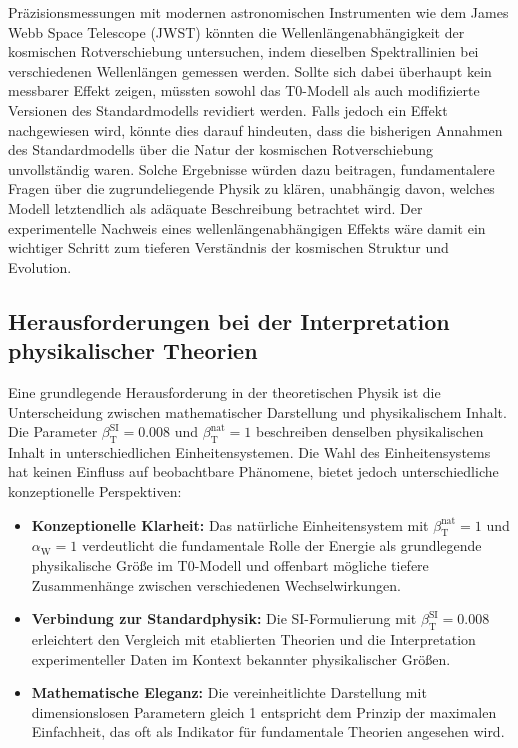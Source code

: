 \documentclass[12pt,a4paper]{article}
\newcommand{\betaT}{\beta_{\text{T}}}
\newcommand{\alphaW}{\alpha_{\text{W}}}
\begin{document}
Präzisionsmessungen mit modernen astronomischen Instrumenten wie dem James Webb Space Telescope (JWST) könnten die Wellenlängenabhängigkeit der kosmischen Rotverschiebung untersuchen, indem dieselben Spektrallinien bei verschiedenen Wellenlängen gemessen werden. Sollte sich dabei überhaupt kein messbarer Effekt zeigen, müssten sowohl das T0-Modell als auch modifizierte Versionen des Standardmodells revidiert werden. Falls jedoch ein Effekt nachgewiesen wird, könnte dies darauf hindeuten, dass die bisherigen Annahmen des Standardmodells über die Natur der kosmischen Rotverschiebung unvollständig waren. Solche Ergebnisse würden dazu beitragen, fundamentalere Fragen über die zugrundeliegende Physik zu klären, unabhängig davon, welches Modell letztendlich als adäquate Beschreibung betrachtet wird. Der experimentelle Nachweis eines wellenlängenabhängigen Effekts wäre damit ein wichtiger Schritt zum tieferen Verständnis der kosmischen Struktur und Evolution.


		
\subsection{Herausforderungen bei der Interpretation physikalischer Theorien}

Eine grundlegende Herausforderung in der theoretischen Physik ist die Unterscheidung zwischen mathematischer Darstellung und physikalischem Inhalt. Die Parameter \(\betaT^{\text{SI}} = 0.008\) und \(\betaT^{\text{nat}} = 1\) beschreiben denselben physikalischen Inhalt in unterschiedlichen Einheitensystemen. Die Wahl des Einheitensystems hat keinen Einfluss auf beobachtbare Phänomene, bietet jedoch unterschiedliche konzeptionelle Perspektiven:

\begin{itemize}
	\item \textbf{Konzeptionelle Klarheit:} Das natürliche Einheitensystem mit \(\betaT^{\text{nat}} = 1\) und \(\alphaW = 1\) verdeutlicht die fundamentale Rolle der Energie als grundlegende physikalische Größe im T0-Modell und offenbart mögliche tiefere Zusammenhänge zwischen verschiedenen Wechselwirkungen.
	
	\item \textbf{Verbindung zur Standardphysik:} Die SI-Formulierung mit \(\betaT^{\text{SI}} = 0.008\) erleichtert den Vergleich mit etablierten Theorien und die Interpretation experimenteller Daten im Kontext bekannter physikalischer Größen.
	
	\item \textbf{Mathematische Eleganz:} Die vereinheitlichte Darstellung mit dimensionslosen Parametern gleich 1 entspricht dem Prinzip der maximalen Einfachheit, das oft als Indikator für fundamentale Theorien angesehen wird.
\end{itemize}
\end{document}
